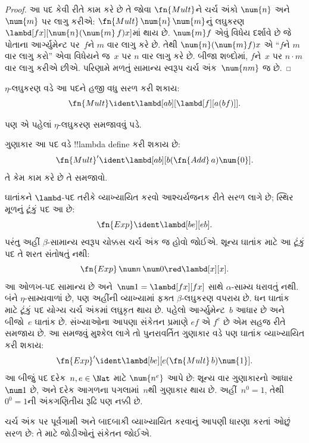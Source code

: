 \documentclass[../../../include/open-logic-section]{subfiles}
\begin{document}
\begin{proof}
આ પદ કેવી રીતે કામ કરે છે તે જોવા $\fn{Mult}$ને ચર્ચ
અંકો $\num{n}$ અને $\num{m}$ પર લાગુ કરીએ:
$\fn{Mult} \, \num{n} \, \num{m}$નું લઘુકરણ
$\lambd[fx][\num{n}(\num{m}\, f)x]$માં થાય છે.
$\num{m} f$ એવું વિધેય દર્શાવે છે જે પોતાના
આર્ગ્યુમેન્ટ પર~$f$ને $m$ વાર લાગુ કરે છે. તેથી
$\num{n} (\num{m} f) x$ એ ``$f$ને $m$
વાર લાગુ કરો'' એવા વિધેયને જ~$x$ પર $n$ વાર
લાગુ કરે છે. બીજા શબ્દોમાં, $f$ને~$x$ પર
$n\cdot m$ વાર લાગુ કરીએ છીએ. પરિણામે મળતું
સામાન્ય સ્વરૂપ ચર્ચ અંક~$\num{nm}$ જ છે.
\end{proof}

\begin{editorial}
$\eta$-લઘુકરણ વડે આ પદને હજી વધુ સરળ કરી શકાય:
\[
  \fn{Mult} \ident \lambd[ab][\lambd[f][a (b f)]].
\]

પણ એ પહેલાં $\eta$-લઘુકરણ સમજાવવું પડે.
\end{editorial}

\begin{prob}
ગુણાકાર આ પદ વડે !!{lambda define} કરી શકાય છે:
\[
  \fn{Mult}' \ident \lambd[ab][b (\fn{Add}\, a) \num{0}].
\]
તે કેમ કામ કરે છે તે સમજાવો.
\end{prob}

ઘાતાંકને $\lambd$-પદ તરીકે વ્યાખ્યાયિત કરવો
આશ્ચર્યજનક રીતે સરળ લાગે છે; સ્થિર મૂળનું ટૂંકું પદ આ છે:
\[
\fn{Exp} \ident \lambd[be][e b].
\]
પરંતુ અહીં $\beta$-સામાન્ય સ્વરૂપ ચોક્કસ ચર્ચ અંક જ
હોવો જોઈએ. શૂન્ય ઘાતાંક માટે આ ટૂંકું પદ તે શરત સંતોષતું નથી:
\[
\fn{Exp}\,\num n\,\num0\red\lambd[x][x].
\]
આ ઓળખ-પદ સામાન્ય છે અને~$\num1=\lambd[fx][fx]$ સાથે
$\alpha$-સામ્ય ધરાવતું નથી. બંને $\eta$-સામ્યવાળાં છે,
પણ અહીંની વ્યાખ્યામાં ફક્ત $\beta$-લઘુકરણ વપરાય છે.
ધન ઘાતાંક માટે ટૂંકું પદ યોગ્ય ચર્ચ અંકમાં લઘુકૃત થાય છે.
પહેલો આર્ગ્યુમેન્ટ~$b$ આધાર છે અને બીજો~$e$
ઘાતાંક છે. સંખ્યાઓના આપણા સંકેતન પ્રમાણે
$e f$ એ $f^e$ છે એમ સહજ રીતે સમજાય છે.
આ સમજવું મુશ્કેલ લાગે તો પુનરાવર્તિત ગુણાકાર
વડે પણ ઘાતાંક વ્યાખ્યાયિત કરી શકાય:
\[
  \fn{Exp}' \ident \lambd[be][e (\fn{Mult}\, b) \num{1}].
\]
આ બીજું પદ દરેક~$n,e\in\Nat$ માટે
$\num{n^e}$ આપે છે: શૂન્ય વાર ગુણાકારનો આધાર~$\num1$ છે,
અને દરેક આગળના પગલામાં~$n$થી ગુણાકાર થાય છે.
અહીં~$n^0=1$, તેથી~$0^0=1$ની અંકગણિતીય રૂઢિ પણ નક્કી છે.

ચર્ચ અંક પર પૂર્વગામી અને બાદબાકી વ્યાખ્યાયિત
કરવાનું આપણી ધારણા કરતાં ઓછું સરળ છે:
તે માટે જોડીઓનું સંકેતન જોઈએ.
\end{document}
